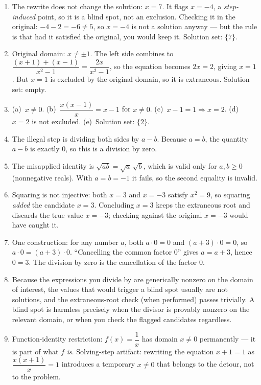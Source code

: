 \documentclass{essay}
\begin{document}
\begin{enumerate}
  \item The rewrite does not change the solution: $x = 7$. It flags $x = -4$, a
    \emph{step-induced} point, so it is a blind spot, not an exclusion. Checking it in the
    original: $-4 - 2 = -6 \neq 5$, so $x=-4$ is not a solution anyway --- but the rule is that
    had it satisfied the original, you would keep it. Solution set: $\{7\}$.

  \item Original domain: $x \neq \pm 1$. The left side combines to
    $\dfrac{(x+1)+(x-1)}{x^2-1} = \dfrac{2x}{x^2-1}$, so the equation becomes $2x = 2$, giving
    $x = 1$. But $x = 1$ is excluded by the original domain, so it is extraneous. Solution set:
    empty.

  \item (a)~$x \neq 0$. (b)~$\dfrac{x(x-1)}{x} = x - 1$ for $x \neq 0$. (c)~$x - 1 = 1
    \Rightarrow x = 2$. (d)~$x = 2$ is not excluded. (e)~Solution set: $\{2\}$.

  \item The illegal step is dividing both sides by $a - b$. Because $a = b$, the quantity
    $a - b$ is exactly $0$, so this is a division by zero.

  \item The misapplied identity is $\sqrt{ab} = \sqrt{a}\,\sqrt{b}$, which is valid only for
    $a, b \ge 0$ (nonnegative reals). With $a = b = -1$ it fails, so the second equality is
    invalid.

  \item Squaring is not injective: both $x = 3$ and $x = -3$ satisfy $x^2 = 9$, so squaring
    \emph{added} the candidate $x = 3$. Concluding $x = 3$ keeps the extraneous root and
    discards the true value $x = -3$; checking against the original $x = -3$ would have caught
    it.

  \item One construction: for any number $a$, both $a \cdot 0 = 0$ and $(a+3)\cdot 0 = 0$, so
    $a \cdot 0 = (a+3)\cdot 0$. ``Cancelling the common factor $0$'' gives $a = a + 3$, hence
    $0 = 3$. The division by zero is the cancellation of the factor $0$.

  \item Because the expressions you divide by are generically nonzero on the domain of
    interest, the values that would trigger a blind spot usually are not solutions, and the
    extraneous-root check (when performed) passes trivially. A blind spot is harmless precisely
    when the divisor is provably nonzero on the relevant domain, or when you check the flagged
    candidates regardless.

  \item Function-identity restriction: $f(x) = \dfrac{1}{x}$ has domain $x \neq 0$
    permanently --- it is part of what $f$ \emph{is}. Solving-step artifact: rewriting the
    equation $x + 1 = 1$ as $\dfrac{x(x+1)}{x} = 1$ introduces a temporary $x \neq 0$ that
    belongs to the detour, not to the problem.

\end{enumerate}
\end{document}
